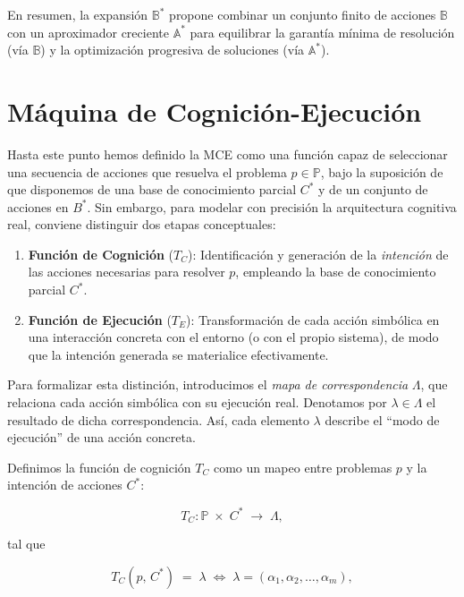 En resumen, la expansión \(\mathbb{B}^*\) propone combinar un conjunto finito de
acciones \(\mathbb{B}\) con un aproximador creciente \(\mathbb{A}^*\) para
equilibrar la garantía mínima de resolución (vía \(\mathbb{B}\)) y la
optimización progresiva de soluciones (vía \(\mathbb{A}^*\)).

\section{Máquina de Cognición-Ejecución}

Hasta este punto hemos definido la MCE como una función capaz de seleccionar una
secuencia de acciones que resuelva el problema \(p \in \mathbb{P}\), bajo la
suposición de que disponemos de una base de conocimiento parcial \(C^*\) y de un
conjunto de acciones en \(B^*\). Sin embargo, para modelar con precisión la
arquitectura cognitiva real, conviene distinguir dos etapas conceptuales:

\begin{enumerate}
    \item \textbf{Función de Cognición} (\(T_C\)): Identificación y generación de la \emph{intención} de las acciones necesarias para resolver \(p\), empleando la base de conocimiento parcial \(C^*\).
    \item \textbf{Función de Ejecución} (\(T_E\)): Transformación de cada acción simbólica en una interacción concreta con el entorno (o con el propio sistema), de modo que la intención generada se materialice efectivamente.
\end{enumerate}

Para formalizar esta distinción, introducimos el \emph{mapa de correspondencia}
\(\Lambda\), que relaciona cada acción simbólica con su ejecución real.
Denotamos por \(\lambda \in \Lambda\) el resultado de dicha correspondencia.
Así, cada elemento \(\lambda\) describe el “modo de ejecución” de una acción
concreta.

Definimos la función de cognición \(T_C\) como un mapeo entre problemas \(p\) y
la intención de acciones \(C^*\):

\begin{equation}
T_C : \mathbb{P} \;\times\; C^* \;\longrightarrow\; \Lambda,
\end{equation}

tal que

\begin{equation}
T_C(p,\,C^*) \;=\; \lambda 
\;\Longleftrightarrow\;
\lambda = (\alpha_1, \alpha_2, \dots, \alpha_m),
\end{equation}

